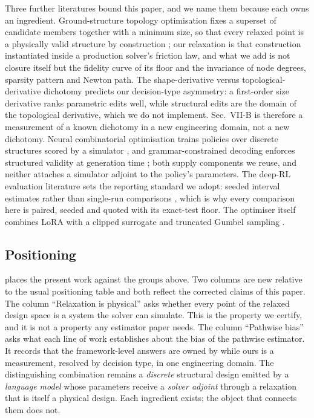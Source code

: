 Three further literatures bound this paper, and we name them because each owns an
ingredient.  Ground-structure topology optimisation fixes a superset of candidate
members together with a minimum size, so that every relaxed point is a physically
valid structure by construction \cite{dorn1964automatic,zegard2014grand3d,guest2004minimum};
our relaxation is that construction instantiated inside a production solver's
friction law, and what we add is not closure itself but the fidelity curve of its
floor and the invariance of node degrees, sparsity pattern and Newton path.  The
shape-derivative versus topological-derivative dichotomy
\cite{sokolowski1999topological} predicts our decision-type asymmetry: a first-order
size derivative ranks parametric edits well, while structural edits are the domain of
the topological derivative, which we do not implement.  Sec.~VII-B is therefore a
measurement of a known dichotomy in a new engineering domain, not a new dichotomy.
Neural combinatorial optimisation trains policies over discrete structures scored by a
simulator \cite{vinyals2015pointer,bello2017neural,kwon2020pomo}, and
grammar-constrained decoding enforces structured validity at generation time
\cite{hokamp2017lexically,post2018fast,willard2023guided}; both supply components we
reuse, and neither attaches a simulator adjoint to the policy's parameters.  The
deep-RL evaluation literature sets the reporting standard we adopt: seeded interval
estimates rather than single-run comparisons \cite{agarwal2021precipice,henderson2018matters},
which is why every comparison here is paired, seeded and quoted with its exact-test
floor.  The optimiser itself combines LoRA \cite{hu2021lora} with a clipped surrogate
\cite{schulman2017ppo} and truncated Gumbel sampling \cite{kool2019stochastic}.

\subsection{Positioning}
\label{sec:rw-positioning}
 places the present work against the groups above.  Two
columns are new relative to the usual positioning table and both reflect the
corrected claims of this paper.  The column ``Relaxation is physical'' asks
whether every point of the relaxed design space is a system the solver can
simulate.  This is the property we certify, and it is not a property any estimator
paper needs.  The column ``Pathwise bias'' asks what each line of work establishes
about the bias of the pathwise estimator.  It records that the framework-level
answers are owned by
\cite{suh2022diffsim,onoda2026ddcg,scheffler2026cfobg,hpo2026} while ours is a
measurement, resolved by decision type, in one engineering domain.  The
distinguishing combination remains a \emph{discrete} structural design emitted by
a \emph{language model} whose parameters receive a \emph{solver adjoint} through a
relaxation that is itself a physical design.  Each ingredient exists; the object
that connects them does not.

